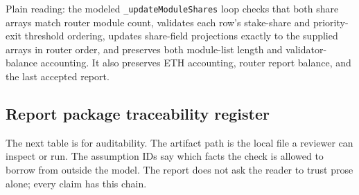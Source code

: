 \noindent Plain reading: the modeled \texttt{\_updateModuleShares} loop checks
that both share arrays match router module count, validates each row's
stake-share and priority-exit threshold ordering, updates share-field
projections exactly to the supplied arrays in router order, and preserves both
module-list length and validator-balance accounting. It also preserves ETH
accounting, router report balance, and the last accepted report.

\subsection*{Report package traceability register}

\noindent The next table is for auditability. The artifact path is the local file
a reviewer can inspect or run. The assumption IDs say which facts the check is
allowed to borrow from outside the model. The report does not ask the reader to
trust prose alone; every claim has this chain.

